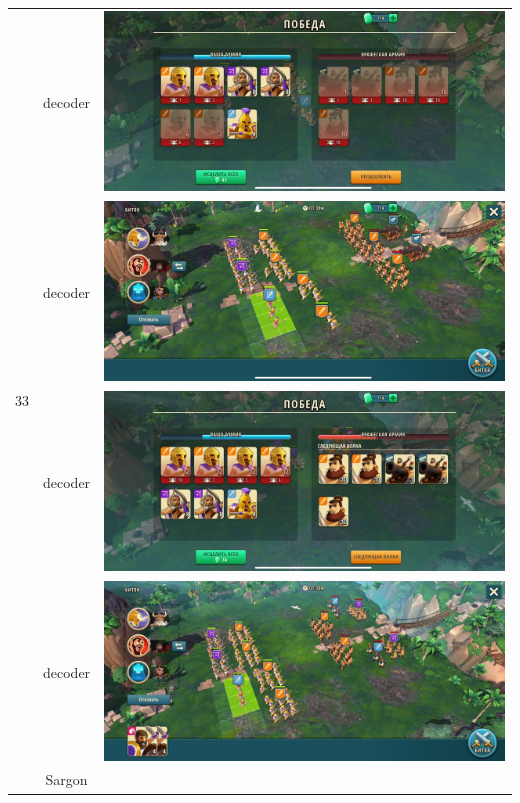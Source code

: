 \begin{longtable}{|c|c|c|}
    \hline
    \multirow{8}{*}{33} & decoder &
    \includegraphics[width=0.75\linewidth]{./parts/media/TreasureHunt/33/decoder/photo_2022-04-07_10-02-27.jpg} \\
    & decoder &
    \includegraphics[width=0.75\linewidth]{./parts/media/TreasureHunt/33/decoder/photo_2022-04-07_10-02-23.jpg} \\
    & decoder &
    \includegraphics[width=0.75\linewidth]{./parts/media/TreasureHunt/33/decoder/photo_2022-04-07_10-02-19.jpg} \\
    & decoder &
    \includegraphics[width=0.75\linewidth]{./parts/media/TreasureHunt/33/decoder/photo_2022-04-07_10-02-11.jpg} \\
    \hline
    \multirow{8}{*}{33} & Sargon &

\end{longtable}
